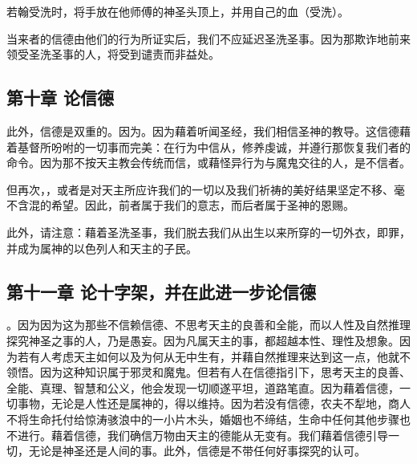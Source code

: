 若翰受洗时，将手放在他师傅的神圣头顶上，并用自己的血（受洗）。\par

当来者的信德由他们的行为所证实后，我们不应延迟圣洗圣事。因为那欺诈地前来领受圣洗圣事的人，将受到谴责而非益处。\par


\subsection{第十章 论信德}

此外，信德是双重的。因为。因为藉着听闻圣经，我们相信圣神的教导。这信德藉着基督所吩咐的一切事而完美：在行为中信从，修养虔诚，并遵行那恢复我们者的命令。因为那不按天主教会传统而信，或藉怪异行为与魔鬼交往的人，是不信者。\par

但再次，，或者是对天主所应许我们的一切以及我们祈祷的美好结果坚定不移、毫不含混的希望。因此，前者属于我们的意志，而后者属于圣神的恩赐。\par

此外，请注意：藉着圣洗圣事，我们脱去我们从出生以来所穿的一切外衣，即罪，并成为属神的以色列人和天主的子民。\par


\subsection{第十一章 论十字架，并在此进一步论信德}

。因为因为这为那些不信赖信德、不思考天主的良善和全能，而以人性及自然推理探究神圣之事的人，乃是愚妄。因为凡属天主的事，都超越本性、理性及想象。因为若有人考虑天主如何以及为何从无中生有，并藉自然推理来达到这一点，他就不领悟。因为这种知识属于邪灵和魔鬼。但若有人在信德指引下，思考天主的良善、全能、真理、智慧和公义，他会发现一切顺遂平坦，道路笔直。因为藉着信德，一切事物，无论是人性还是属神的，得以维持。因为若没有信德，农夫不犁地，商人不将生命托付给惊涛骇浪中的一小片木头，婚姻也不缔结，生命中任何其他步骤也不进行。藉着信德，我们确信万物由天主的德能从无变有。我们藉着信德引导一切，无论是神圣还是人间的事。此外，信德是不带任何好事探究的认可。\par

